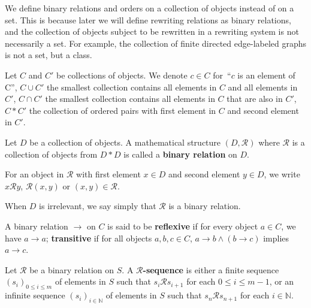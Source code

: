 We define binary relations and orders on a collection of objects instead of on a set. This is because later we will define rewriting relations as binary relations, and the collection of objects subject to be rewritten in a rewriting system is not necessarily a set. For example, the collection of finite directed edge-labeled graphs is not a set, but a class.

\begin{notation}
    Let $C$ and $C'$ be collections of objects. We denote $c \mathop{\in} C$ for~\enquote{$c$ is an element of C}, $C \mathop{\cup} C'$ the smallest collection contains all elements in $C$ and all elements in $C'$, $C \mathop{\cap} C'$ the smallest collection contains all elements in $C$ that are also in $C'$, $C * C'$ the collection of ordered pairs with first element in $C$ and second element in $C'$.  
  \end{notation} 
  
  \begin{definition}
    \label{def:binary_relation:binary_relation}
    Let $D$ be a collection of objects. A mathematical structure \( (D, \mathcal{R}) \) where $\mathcal{R}$ is a collection of objects from $D * D$ is called a \textbf{binary relation} on $D$. 
    
    For an object in $\mathcal{R}$ with first element $x \mathop{\in} D$ and second element $y\in D$, we write $x \mathcal{R} y$, $\mathcal{R}(x,y)$ or $(x,y) \mathop{\in} \mathcal{R}$. 
    
    When $D$ is irrelevant, we say simply that $\mathcal{R}$ is a binary relation.
  \end{definition} 
   
  \begin{definition}
    \label{def:binary_relation:reflexivity_transitivity}
    A binary relation \( \mathop{\to} \) on \(C\) is said to be \textbf{reflexive} if for every object \(a \mathop{\in} C\), we have \(a \mathop{\to} a\); \textbf{transitive} if for all objects \( a, b, c \mathop{\in} C\), \( a \mathop{\to} b \mathop{\land} (b \mathop{\to} c) \) implies \(a \mathop{\to} c\).
  \end{definition}
  
  \begin{definition}
    \label{def:binary_relation:sequence}
    Let \(\mathcal{R}\) be a binary relation on $S$.
    A \textbf{\( \mathcal{R} \)-sequence} is either a finite sequence \( \left( s_i \right)_{0 \leq i \leq m} \) of elements in $S$ such that \(s_i \mathcal{R} s_{i+1}\) for each \( 0 \leq i \leq m-1\), or an infinite sequence \((s_i)_{i \mathop{\in} \mathbb{N}}\) of elements in $S$ such that \(s_n \mathcal{R} s_{n+1}\) for each \(i \mathop{\in} \mathbb{N}\).
\end{definition}


